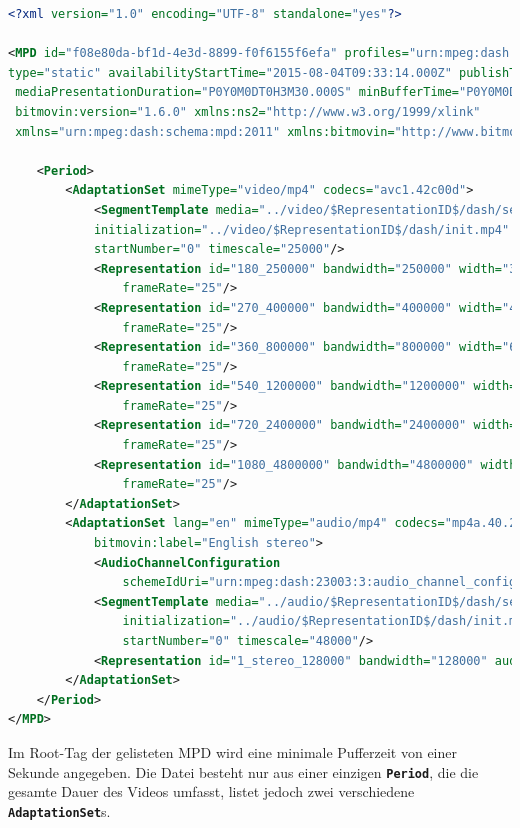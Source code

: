\documentclass[paper = a4, fontsize = 12pt, parskip = half]{scrartcl} %
\def\elem#1{\texttt{\textbf{#1}}}
\begin{document}
\begin{lstlisting}[language=XML,basicstyle=\small]
<?xml version="1.0" encoding="UTF-8" standalone="yes"?>

<MPD id="f08e80da-bf1d-4e3d-8899-f0f6155f6efa" profiles="urn:mpeg:dash:profile:isoff-main:2011"
type="static" availabilityStartTime="2015-08-04T09:33:14.000Z" publishTime="2015-08-04T10:47:32.000Z"
 mediaPresentationDuration="P0Y0M0DT0H3M30.000S" minBufferTime="P0Y0M0DT0H0M1.000S" 
 bitmovin:version="1.6.0" xmlns:ns2="http://www.w3.org/1999/xlink" 
 xmlns="urn:mpeg:dash:schema:mpd:2011" xmlns:bitmovin="http://www.bitmovin.net/mpd/2015">

    <Period>
        <AdaptationSet mimeType="video/mp4" codecs="avc1.42c00d">
            <SegmentTemplate media="../video/$RepresentationID$/dash/segment_$Number$.m4s" 
            initialization="../video/$RepresentationID$/dash/init.mp4" duration="100000" 
            startNumber="0" timescale="25000"/>
            <Representation id="180_250000" bandwidth="250000" width="320" height="180" 
                frameRate="25"/>
            <Representation id="270_400000" bandwidth="400000" width="480" height="270"  
                frameRate="25"/>
            <Representation id="360_800000" bandwidth="800000" width="640" height="360" 
                frameRate="25"/>
            <Representation id="540_1200000" bandwidth="1200000" width="960" height="540"  
                frameRate="25"/>
            <Representation id="720_2400000" bandwidth="2400000" width="1280" height="720"  
                frameRate="25"/>
            <Representation id="1080_4800000" bandwidth="4800000" width="1920" height="1080" 
                frameRate="25"/>
        </AdaptationSet>
        <AdaptationSet lang="en" mimeType="audio/mp4" codecs="mp4a.40.2" 
			bitmovin:label="English stereo">
            <AudioChannelConfiguration 
                schemeIdUri="urn:mpeg:dash:23003:3:audio_channel_configuration:2011" value="2"/>
            <SegmentTemplate media="../audio/$RepresentationID$/dash/segment_$Number$.m4s" 
                initialization="../audio/$RepresentationID$/dash/init.mp4" duration="191472" 
                startNumber="0" timescale="48000"/>
            <Representation id="1_stereo_128000" bandwidth="128000" audioSamplingRate="48000"/>
        </AdaptationSet>
    </Period>
</MPD>
\end{lstlisting}

Im Root-Tag der gelisteten MPD wird eine minimale Pufferzeit von einer Sekunde angegeben. Die Datei besteht nur aus einer einzigen \elem{Period}, die die gesamte Dauer des Videos umfasst, listet jedoch zwei verschiedene \elem{AdaptationSet}s. 
\end{document}
